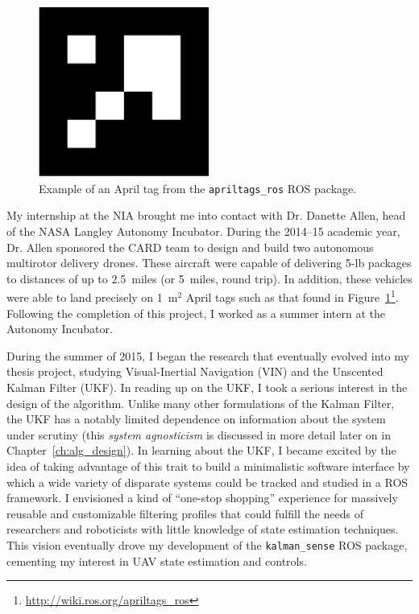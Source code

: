 \begin{figure}
  \centering
    \includegraphics[width=0.5\textwidth]{april_tag}
  \caption[Example April tag]{Example of an April tag from the \texttt{apriltags\_ros} ROS package.}
  \label{fig:april_tag}
\end{figure}

My internship at the NIA brought me into contact with Dr. Danette Allen, head of the NASA Langley Autonomy Incubator. During the 2014--15 academic year, Dr. Allen sponsored the CARD team to design and build two autonomous multirotor delivery drones. These aircraft were capable of delivering 5-lb packages to distances of up to 2.5~miles (or 5~miles, round trip). In addition, these vehicles were able to land precisely on 1~m$^2$ April tags such as that found in Figure~\ref{fig:april_tag}\footnote{\url{http://wiki.ros.org/apriltags\_ros}}. Following the completion of this project, I worked as a summer intern at the Autonomy Incubator.

During the summer of 2015, I began the research that eventually evolved into my thesis project, studying Visual-Inertial Navigation (VIN) and the Unscented Kalman Filter (UKF). In reading up on the UKF, I took a serious interest in the design of the algorithm. Unlike many other formulations of the Kalman Filter, the UKF has a notably limited dependence on information about the system under scrutiny (this \textit{system agnosticism} is discussed in more detail later on in Chapter~\ref{ch:alg_design}). In learning about the UKF, I became excited by the idea of taking advantage of this trait to build a minimalistic software interface by which a wide variety of disparate systems could be tracked and studied in a ROS framework. I envisioned a kind of ``one-stop shopping'' experience for massively reusable and customizable filtering profiles that could fulfill the needs of researchers and roboticists with little knowledge of state estimation techniques. This vision eventually drove my development of the \texttt{kalman\_sense} ROS package, cementing my interest in UAV state estimation and controls.

